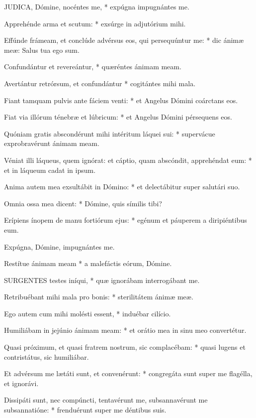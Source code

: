 
\lettrine[lines=2]{J}{UDICA}, Dómine, nocéntes me, * expúgna impugnántes me.

Apprehénde arma et scutum: * exsúrge in adjutórium mihi.

Effúnde frámeam, et conclúde advérsus eos, qui persequúntur me: * dic ánimæ meæ: Salus tua ego sum.

Confundántur et revereántur, * quæréntes ánimam meam.

Avertántur retrórsum, et confundántur * cogitántes mihi mala.

Fiant tamquam pulvis ante fáciem venti: * et Angelus Dómini coárctans eos.

Fiat via illórum ténebræ et lúbricum: * et Angelus Dómini pérsequens eos.

Quóniam gratis abscondérunt mihi intéritum láquei sui: * supervácue exprobravérunt ánimam meam.

Véniat illi láqueus, quem ignórat: et cáptio, quam abscóndit, apprehéndat eum: * et in láqueum cadat in ipsum.

Anima autem mea exsultábit in Dómino: * et delectábitur super salutári suo.

Omnia ossa mea dicent: * Dómine, quis símilis tibi?

Erípiens ínopem de manu fortiórum ejus: * egénum et páuperem a diripiéntibus eum.

 Expúgna, Dómine, impugnántes me.

 Restítue ánimam meam * a malefáctis eórum, Dómine.


\lettrine[lines=2]{S}{URGENTES} testes iníqui, * quæ ignorábam interrogábant me.

Retribuébant mihi mala pro bonis: * sterilitátem ánimæ meæ.

Ego autem cum mihi molésti essent, * induébar cilício.

Humiliábam in jejúnio ánimam meam: * et orátio mea in sinu meo convertétur.

Quasi próximum, et quasi fratrem nostrum, sic complacébam: * quasi lugens et contristátus, sic humiliábar.

Et advérsum me lætáti sunt, et convenérunt: * congregáta sunt super me flagélla, et ignorávi.

Dissipáti sunt, nec compúncti, tentavérunt me, subsannavérunt me subsannatióne: * frenduérunt super me déntibus suis.

